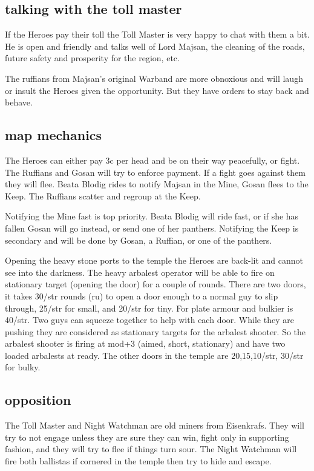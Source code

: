 \subsection*{talking with the toll master}
If the Heroes pay their toll the Toll Master is very happy to chat with them a bit. He is open and friendly and talks well of Lord Majsan, the cleaning of the roads, future safety and prosperity for the region, etc.

The ruffians from Majsan's original Warband are more obnoxious and will laugh or insult the Heroes given the opportunity. But they have orders to stay back and behave.


\subsection*{map mechanics}
The Heroes can either pay 3c per head and be on their way peacefully, or fight. The Ruffians and Gosan will try to enforce payment. If a fight goes against them they will flee. Beata Blodig rides to notify Majsan in the Mine, Gosan flees to the Keep. The Ruffians scatter and regroup at the Keep.

Notifying the Mine fast is top priority. Beata Blodig will ride fast, or if she has fallen Gosan will go instead, or send one of her panthers. Notifying the Keep is secondary and will be done by Gosan, a Ruffian, or one of the panthers.

Opening the heavy stone ports to the temple the Heroes are back-lit and cannot see into the darkness. The heavy arbalest operator will be able to fire on stationary target (opening the door) for a couple of rounds. There are two doors, it takes 30/str rounds (ru) to open a door enough to a normal guy to slip through, 25/str for small, and 20/str for tiny. For plate armour and bulkier is 40/str. Two guys can squeeze together to help with each door. While they are pushing they are considered as stationary targets for the arbalest shooter. So the arbalest shooter is firing at mod+3 (aimed, short, stationary) and have two loaded arbalests at ready.
The other doors in the temple are 20,15,10/str, 30/str for bulky.


\subsection*{opposition}
The Toll Master and Night Watchman are old miners from Eisenkrafs. They will try to not engage unless they are sure they can win, fight only in supporting fashion, and they will try to flee if things turn sour. The Night Watchman will fire both ballistas if cornered in the temple then try to hide and escape.

